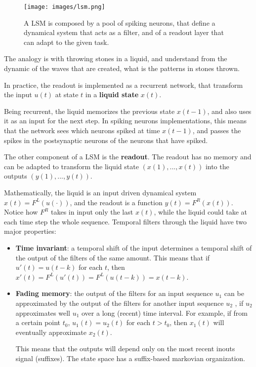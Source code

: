 \documentclass[oneside]{book}
\theoremstyle{definition}
\theoremstyle{plain}
\begin{document}
\begin{figure}
    \centering
    \texttt{[image: images/lsm.png]}
    \caption{A LSM is composed by a pool of spiking neurons, that define a dynamical system that acts as a filter, and of a readout layer that can adapt to the given task.}
    \label{fig:lsm}
\end{figure}
The analogy is with throwing stones in a liquid, and understand from the dynamic of the waves that are created, what is the patterns  in stones thrown. 

In practice, the readout is implemented as a recurrent network, that transform the input $u(t)$ at state $t$ in a \textbf{liquid state} $x(t)$. 

Being recurrent, the liquid memorizes the previous state $x(t-1)$, and also uses it as an input for the next step. In spiking neurons implementations, this means that the network sees which neurons spiked at time $x(t-1)$, and passes the spikes in the postsynaptic neurons of the neurons that have spiked.

The other component of a LSM is the \textbf{readout}. The readout has no memory and can be adapted to transform the liquid state $(x(1),...,x(t))$ into the outputs $(y(1),...,y(t))$.

Mathematically, the liquid is an input driven dynamical system $x(t)=F^L(u(\cdot))$, and the readout is a function $y(t)=F^R(x(t))$. Notice how $F^R$ takes in input only the last $x(t)$, while the liquid could take at each time step the whole sequence.
Temporal filters through the liquid have two major properties:
\begin{itemize}
    \item \textbf{Time invariant}: a temporal shift of the input determines a temporal shift of the output of the filters of the same amount. This means that if $u'(t) =u(t-k)$ for each $t$, then $ x'(t) =F^L(u'(t)) =F^L(u(t-k))=x(t-k)$.
    
\item \textbf{Fading memory}:
the output of the filters for an input sequence $u_1$ can be approximated by
the output of the filters for another input sequence $u_2$ , if $u_2$ approximates
well $u_1$  over a long (recent) time interval. For example, if from a certain point $t_0$, $u_1(t)=u_2(t)$ for each $t>t_0$, then $x_1(t)$ will eventually approximate $x_2(t)$.

This means that the outputs will depend only on the most recent inouts signal (suffixes). The state space has a suffix-based markovian organization.
\end{itemize}
\end{document}
